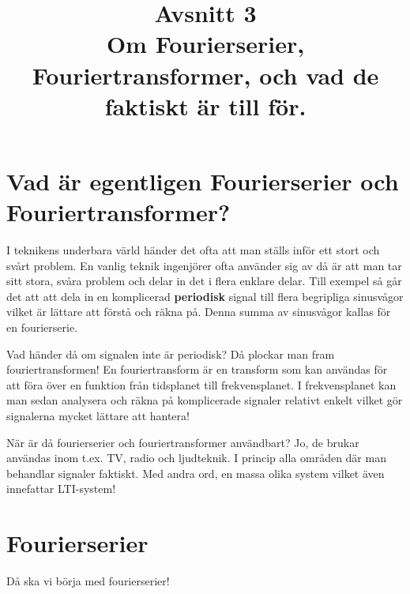\documentclass{article}
\title{Avsnitt 3 \\
\large Om Fourierserier, Fouriertransformer, och vad de faktiskt är till för.}
\author{ }
\date{}
\begin{document}
\maketitle

\section{Vad är egentligen Fourierserier och Fouriertransformer?}
I teknikens underbara värld händer det ofta att man ställs inför ett stort och svårt problem. En vanlig teknik ingenjörer ofta använder sig av då är att man tar sitt stora, svåra problem och delar in det i flera enklare delar. Till exempel så går det att att  dela in en komplicerad \textbf{periodisk} signal till flera begripliga sinusvågor vilket är lättare att förstå och räkna på. Denna summa av sinusvågor kallas för en fourierserie. 

Vad händer då om signalen inte är periodisk? Då plockar man fram fouriertransformen! En fouriertransform är en transform som kan användas för att föra över en funktion från tidsplanet till frekvensplanet. I frekvensplanet kan man sedan analysera och räkna på komplicerade signaler relativt enkelt vilket gör signalerna mycket lättare att hantera! 

När är då fourierserier och fouriertransformer användbart? Jo, de brukar användas inom t.ex. TV, radio och ljudteknik. I princip alla områden där man behandlar signaler faktiskt. Med andra ord, en massa olika system vilket även innefattar LTI-system!

\section{Fourierserier}

Då ska vi börja med fourierserier!
\end{document}
